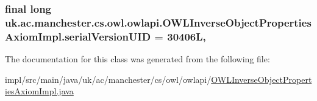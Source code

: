 \hypertarget{classuk_1_1ac_1_1manchester_1_1cs_1_1owl_1_1owlapi_1_1_o_w_l_inverse_object_properties_axiom_impl_a62706a4a282772f95cfd754b9f8b9764}{
\subsubsection[{serial\-Version\-U\-I\-D}]{\setlength{\rightskip}{0pt plus 5cm}final long uk.\-ac.\-manchester.\-cs.\-owl.\-owlapi.\-O\-W\-L\-Inverse\-Object\-Properties\-Axiom\-Impl.\-serial\-Version\-U\-I\-D = 30406\-L\hspace{0.3cm}{\ttfamily [static]}, {\ttfamily [private]}}}\label{classuk_1_1ac_1_1manchester_1_1cs_1_1owl_1_1owlapi_1_1_o_w_l_inverse_object_properties_axiom_impl_a62706a4a282772f95cfd754b9f8b9764}


The documentation for this class was generated from the following file\-:\begin{DoxyCompactItemize}
\item 
impl/src/main/java/uk/ac/manchester/cs/owl/owlapi/\hyperlink{_o_w_l_inverse_object_properties_axiom_impl_8java}{O\-W\-L\-Inverse\-Object\-Properties\-Axiom\-Impl.\-java}\end{DoxyCompactItemize}
